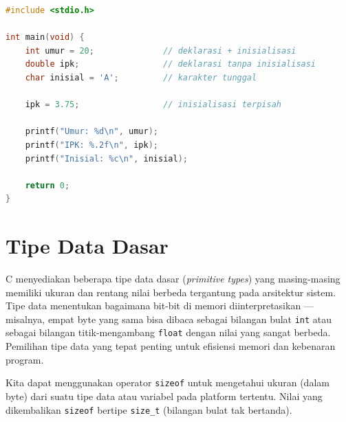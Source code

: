 \documentclass[../main.tex]{subfiles}
\begin{document}
\begin{lstlisting}[language=C,caption=Deklarasi dan inisialisasi variabel]
#include <stdio.h>

int main(void) {
    int umur = 20;              // deklarasi + inisialisasi
    double ipk;                 // deklarasi tanpa inisialisasi
    char inisial = 'A';         // karakter tunggal
    
    ipk = 3.75;                 // inisialisasi terpisah
    
    printf("Umur: %d\n", umur);
    printf("IPK: %.2f\n", ipk);
    printf("Inisial: %c\n", inisial);
    
    return 0;
}
\end{lstlisting}

\section{Tipe Data Dasar}

C menyediakan beberapa tipe data dasar (\textit{primitive types}) yang masing-masing memiliki ukuran dan rentang nilai berbeda tergantung pada arsitektur sistem. Tipe data menentukan bagaimana bit-bit di memori diinterpretasikan --- misalnya, empat byte yang sama bisa dibaca sebagai bilangan bulat \texttt{int} atau sebagai bilangan titik-mengambang \texttt{float} dengan nilai yang sangat berbeda. Pemilihan tipe data yang tepat penting untuk efisiensi memori dan kebenaran program.

Kita dapat menggunakan operator \texttt{sizeof} untuk mengetahui ukuran (dalam byte) dari suatu tipe data atau variabel pada platform tertentu. Nilai yang dikembalikan \texttt{sizeof} bertipe \texttt{size\_t} (bilangan bulat tak bertanda).
\end{document}

